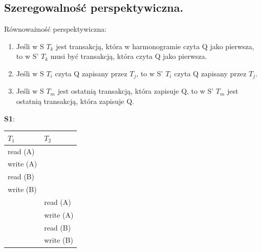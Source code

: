 \documentclass[12pt]{article}
\begin{document}
    \subsection{Szeregowalność perspektywiczna.}
    Równoważność perspektywiczna:
    \begin{enumerate}[label=(\Alph*)]
        \item Jeśli w S $T_k$ jest transakcją, która w
        harmonogramie czyta Q jako pierwsza, to w S' $T_k$ musi być transakcją, która czyta Q jako pierwsza.
        \item Jeśli w S $T_i$ czyta Q zapisany przez $T_j$, to w S' $T_i$ czyta Q zapisany przez $T_j$.
        \item Jeśli w S  $T_m$ jest ostatnią transakcją, która
        zapisuje Q, to w S' $T_m$ jest ostatnią transakcją, która zapisuje Q.
    \end{enumerate}

    \noindent \textbf{S1}:
    \begin{table}[H]
        \begin{center}
            \begin{tabular}{| p{6cm} | p{6cm} |}
                \hline
                $T_1$ & $T_2$\\
                \hline
                \hline
                read (A) &\\
                \hline
                write (A) &\\
                \hline
                read (B)&\\
                \hline
                write (B)&\\
                \hline
                & read (A)\\
                \hline
                & write (A)\\
                \hline
                & read (B)\\
                \hline
                & write (B)\\
                \hline
            \end{tabular}
        \end{center}
    \end{table}
\end{document}
